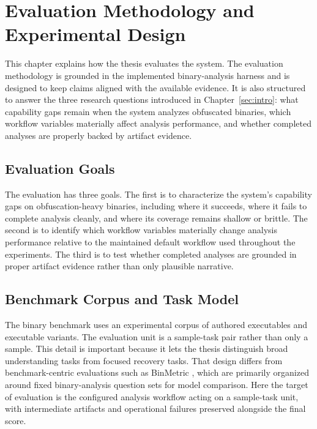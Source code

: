 \chapter{Evaluation Methodology and Experimental Design}
\label{sec:evaluation}

This chapter explains how the thesis evaluates the system. The evaluation methodology is grounded in the implemented binary-analysis harness and is designed to keep claims aligned with the available evidence. It is also structured to answer the three research questions introduced in Chapter~\ref{sec:intro}: what capability gaps remain when the system analyzes obfuscated binaries, which workflow variables materially affect analysis performance, and whether completed analyses are properly backed by artifact evidence.

\section{Evaluation Goals}

The evaluation has three goals. The first is to characterize the system's capability gaps on obfuscation-heavy binaries, including where it succeeds, where it fails to complete analysis cleanly, and where its coverage remains shallow or brittle. The second is to identify which workflow variables materially change analysis performance relative to the maintained default workflow used throughout the experiments. The third is to test whether completed analyses are grounded in proper artifact evidence rather than only plausible narrative.

\section{Benchmark Corpus and Task Model}

The binary benchmark uses an experimental corpus of authored executables and executable variants. The evaluation unit is a sample-task pair rather than only a sample. This detail is important because it lets the thesis distinguish broad understanding tasks from focused recovery tasks. That design differs from benchmark-centric evaluations such as BinMetric \cite{shang2025binmetriccomprehensivebinaryanalysis}, which are primarily organized around fixed binary-analysis question sets for model comparison. Here the target of evaluation is the configured analysis workflow acting on a sample-task unit, with intermediate artifacts and operational failures preserved alongside the final score.

